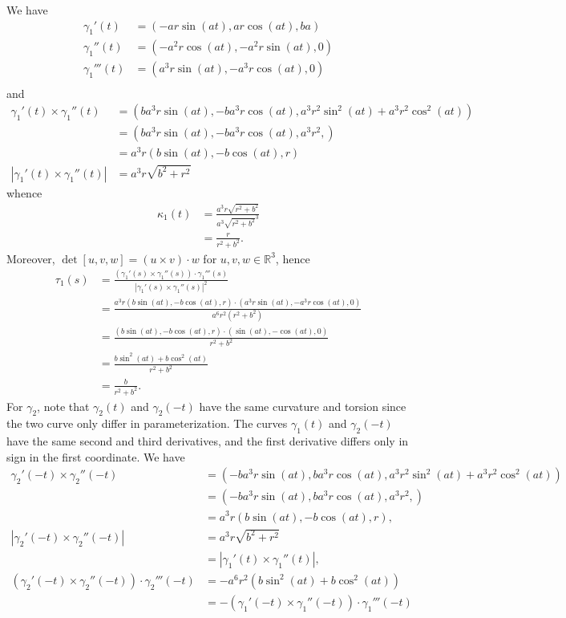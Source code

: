 \documentclass{article}
\theoremstyle{definition}
\newcommand{\R}{\mathbb{R}}
\begin{document}
We have
\begin{align*}
	\gamma_1'(t) 
	&= 
	(-ar \sin(at), ar \cos(at), ba) \\
	\gamma_1''(t)
	&=
	(-a^2r \cos(at), -a^2r \sin(at), 0) \\
	\gamma_1'''(t)
	&=
	(a^3r \sin(at), -a^3r \cos(at), 0) \\
\end{align*}
and 
\begin{align*}
	\gamma_1'(t) \times \gamma_1''(t)
	&=
	(
	ba^3r \sin(at),
	-ba^3r \cos(at), 
	a^3r^2 \sin^2(at) + a^3r^2 \cos^2(at)
	) \\
	&=
	(
	ba^3r \sin(at),
	-ba^3r \cos(at), 
	a^3r^2, 
	) \\
	&=
	a^3r(b \sin(at), -b \cos(at), r) \\
	|\gamma_1'(t) \times \gamma_1''(t)|
	&=
	a^3r \sqrt{b^2 + r^2}
\end{align*}
whence
\begin{align*}
	\kappa_1(t)
	&=
	\frac{a^3r \sqrt{r^2 + b^2}}{a^3 \sqrt{r^2 + b^2}^3} \\
	&=
	\frac{r}{r^2 + b^2}.
\end{align*}
Moreover, $\det[u,v,w] = (u \times v) \cdot w$ for $u,v,w \in \R^3$, hence 
\begin{align*}
	\tau_1(s)
	&=
	\frac
	{(\gamma_1'(s) \times \gamma_1''(s)) \cdot \gamma_1'''(s)}
	{|\gamma_1'(s) \times \gamma_1''(s)|^2} \\
	&=
	\frac
	{a^3r(b \sin(at), -b \cos(at), r) \cdot (a^3r \sin(at), -a^3r \cos(at), 0)}
	{a^6r^2(r^2 + b^2)} \\
	&=
	\frac
	{(b \sin(at), -b \cos(at), r) \cdot (\sin(at), - \cos(at), 0)}
	{r^2 + b^2} \\
	&=
	\frac
	{b \sin^2(at) + b \cos^2(at)}
	{r^2 + b^2} \\
	&=
	\frac{b}{r^2 + b^2}.
\end{align*}
For $\gamma_2$, note that $\gamma_2(t)$ and $\gamma_2(-t)$ have the same
curvature and torsion since the two curve only differ in parameterization. The
curves $\gamma_1(t)$ and $\gamma_2(-t)$ have the same second and third
derivatives, and the first derivative differs only in sign in the first
coordinate. We have
\begin{align*}
	\gamma_2'(-t) \times \gamma_2''(-t)
	&=
	(
	-ba^3r \sin(at),
	ba^3r \cos(at), 
	a^3r^2 \sin^2(at) + a^3r^2 \cos^2(at)
	) \\
	&=
	(
	-ba^3r \sin(at),
	ba^3r \cos(at), 
	a^3r^2, 
	) \\
	&=
	a^3r(b \sin(at), -b \cos(at), r), \\
	|\gamma_2'(-t) \times \gamma_2''(-t)|
	&=
	a^3r \sqrt{b^2 + r^2} \\
	&=
	|\gamma_1'(t) \times \gamma_1''(t)|, \\
	(\gamma_2'(-t) \times \gamma_2''(-t)) \cdot \gamma_2'''(-t)
	&=
	-a^6r^2(b \sin^2(at) + b \cos^2(at)) \\
	&=
	-
	(\gamma_1'(-t) \times \gamma_1''(-t)) \cdot \gamma_1'''(-t)
\end{align*}
\end{document}
